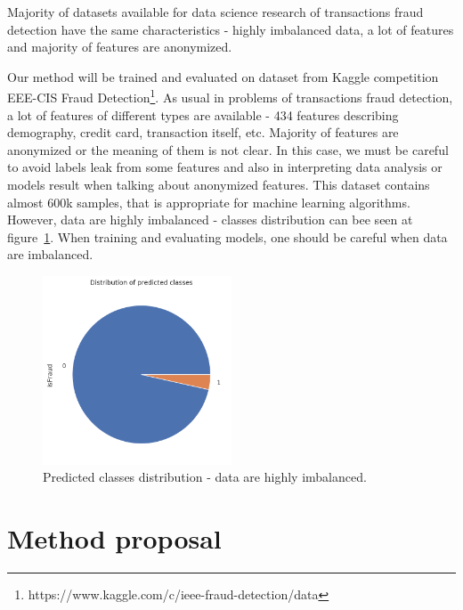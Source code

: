 \documentclass[runningheads]{llncs}
\begin{document}

Majority of datasets available for data science research of transactions fraud detection have the same characteristics - highly imbalanced data, a lot of features and majority of features are anonymized.

Our method will be trained and evaluated on dataset from Kaggle competition EEE-CIS Fraud Detection\footnote{https://www.kaggle.com/c/ieee-fraud-detection/data}. As usual in problems of transactions fraud detection, a lot of features of different types are available - 434 features describing demography, credit card, transaction itself, etc. Majority of features are anonymized or the meaning of them is not clear. In this case, we must be careful to avoid labels leak from some features and also in interpreting data analysis or models result when talking about anonymized features. This dataset contains almost 600k samples, that is appropriate for machine learning algorithms. However, data are highly imbalanced - classes distribution can bee seen at figure~\ref{fig:classes}. When training and evaluating models, one should be careful when data are imbalanced.

\begin{figure}[ht]
	\begin{center}
	    \includegraphics[width=0.5\textwidth]{figures/class_distribution.png}
    \end{center}
	\caption{Predicted classes distribution - data are highly imbalanced.}
	\label{fig:classes}
\end{figure}


\section{Method proposal}
\end{document}
